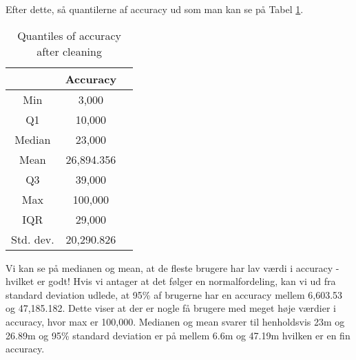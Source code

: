 Efter dette, så quantilerne af accuracy ud som man kan se på Tabel \ref{tab:acc_quantiles}. 
 \begin{table}[htbp]
        \centering
        \small
        \setlength\tabcolsep{2pt}
        \begin{tabular}{|c|c|c|}
            \hline
                         & Accuracy      \\[-1pt]
            \hline
                 Min &  3,000       \\
            \hline
                 Q1      &  10,000   \\
            \hline
                 Median  &  23,000    \\
            \hline
                 Mean    &  26,894.356    \\
            \hline
                 Q3      &  39,000      \\
            \hline
                 Max &  100,000   \\
            \hline
                 IQR     &   29,000     \\
            \hline
                Std. dev.  &  20,290.826   \\
            \hline
        \end{tabular}
        \caption{Quantiles of accuracy after cleaning} %
        \label{tab:acc_quantiles}
\end{table}

Vi kan se på medianen og mean, at de fleste brugere har lav værdi i accuracy - hvilket er godt! Hvis vi antager at det følger en normalfordeling, kan vi ud fra standard deviation udlede, at 95\% af brugerne har en accuracy mellem 6,603.53 og 47,185.182. Dette viser at der er nogle få brugere med meget høje værdier i accuracy, hvor max er 100,000. Medianen og mean svarer til henholdsvis 23m og 26.89m og 95\% standard deviation er på mellem 6.6m og 47.19m hvilken er en fin accuracy. 



